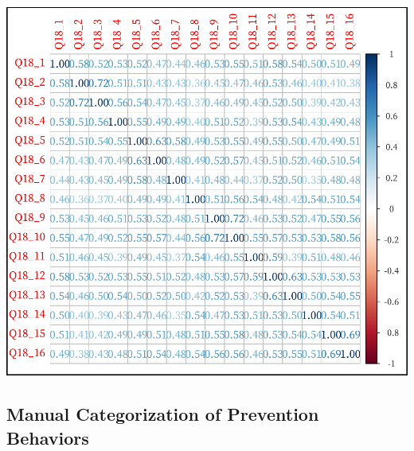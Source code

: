 \documentclass[
]{article}
\begin{document}
\includegraphics{SecondPhase_files/figure-latex/unnamed-chunk-1-1.pdf}

\hypertarget{manual-categorization-of-prevention-behaviors}{%
\subsection{Manual Categorization of Prevention
Behaviors}\label{manual-categorization-of-prevention-behaviors}}
\end{document}
